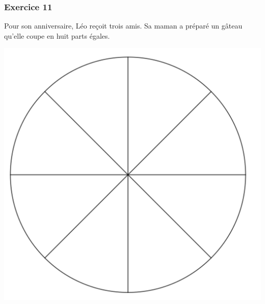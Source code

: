 \documentclass[xcolor={dvipsnames}]{beamer}
\begin{document}
\begin{frame}
	\frametitle{Exercice 11}
	
	Pour son anniversaire, Léo reçoit trois amis. Sa maman a préparé un gâteau qu'elle coupe en huit parts égales.
	
	
	
	\begin{center}
		\includegraphics[scale=0.08]{11_1}
	\end{center}
\end{frame}
\end{document}
